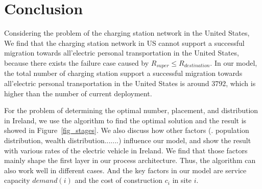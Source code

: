 \section{Conclusion}
\label{sec_conclusion}
Considering the problem of the charging station network in the United States,
We find that the charging station network in US cannot support a successful migration towards all'electric personal transportation in the United States,
because there exists the failure case caused by $R_{super} \leq R_{destination}$.
In our model, the total number of charging station support a successful migration towards all'electric personal transportation in the United States  is around 3792,
which is higher than the number of current deployment.

For the problem of determining the optimal number, placement, and distribution in Ireland,
we use the algorithm to find the optimal solution and the result is showed in Figure~\ref{fig_stages}.
We also discuss how other factors (\eg. population distribution, wealth distribution.......) influence our model,
and show the result with various rates of the electric vehicle in Ireland.
We find that those factors mainly shape the first layer in our process architecture.
Thus, the algorithm can also work well in different cases. And the key factors in our model are service capacity $demand(i)$ and the cost of construction $c_i$ in site $i$.  


